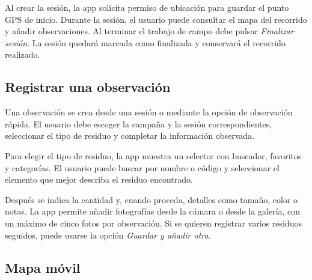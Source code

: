 
Al crear la sesión, la app solicita permiso de ubicación para guardar el punto GPS de
inicio. Durante la sesión, el usuario puede consultar el mapa del recorrido y añadir
observaciones. Al terminar el trabajo de campo debe pulsar \textit{Finalizar sesión}.
La sesión quedará marcada como finalizada y conservará el recorrido realizado.


\subsection{Registrar una observación}

Una observación se crea desde una sesión o mediante la opción de observación rápida.
El usuario debe escoger la campaña y la sesión correspondientes, seleccionar el tipo
de residuo y completar la información observada.


Para elegir el tipo de residuo, la app muestra un selector con buscador, favoritos y
categorías. El usuario puede buscar por nombre o código y seleccionar el elemento que
mejor describa el residuo encontrado.


Después se indica la cantidad y, cuando proceda, detalles como tamaño, color o notas.
La app permite añadir fotografías desde la cámara o desde la galería, con un máximo
de cinco fotos por observación. Si se quieren registrar varios residuos seguidos,
puede usarse la opción \textit{Guardar y añadir otra}.


\subsection{Mapa móvil}


